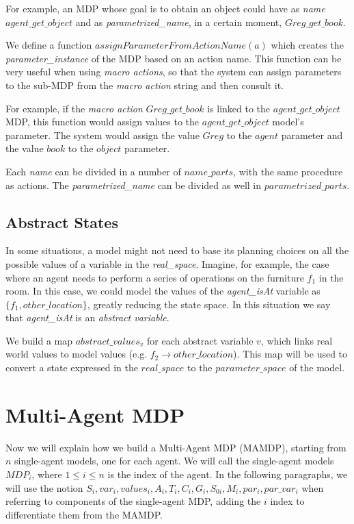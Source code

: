 For example, an MDP whose goal is to obtain an object could have as \textit{name} $agent\_get\_object$ and as \textit{parametrized\_name}, in a certain moment, $Greg\_get\_book$.

We define a function $assignParameterFromActionName(a)$ which creates the \textit{parameter\_instance} of the MDP based on an action name. This function can be very useful when using \textit{macro actions}, so that the system can assign parameters to the sub-MDP from the \textit{macro action} string and then consult it.

For example, if the \textit{macro action} $Greg\_get\_book$ is linked to the $agent\_get\_object$ MDP, this function would assign values to the  $agent\_get\_object$ model's parameter. The system would assign the value $Greg$ to the $agent$ parameter and the value $book$ to the $object$ parameter. 

Each \textit{name} can be divided in a number of $name\_parts$,  with the same procedure as actions. The \textit{parametrized\_name} can be divided as well in $parametrized\_parts$.


\subsection{Abstract States}

In some situations, a model might not need to base its planning choices on all the possible values of a variable in the \textit{real\_space}. Imagine, for example, the case where an agent needs to perform a series of operations on the furniture $f_1$ in the room. In this case, we could model the  values of the \textit{agent\_isAt} variable as $\{f_1 , other\_location\}$, greatly reducing the state space. In this situation we say that \textit{agent\_isAt} is an \textit{abstract variable}. 

We build a map $abstract\_values_v$ for each abstract variable $v$, which links real world values to model values (e.g. $f_2 \rightarrow other\_location$). This map will be used to convert a state expressed in the $real\_space$ to the $parameter\_space$ of the model. 

\section{Multi-Agent MDP}
\label{sec:mamdp-mamdp}
Now we will explain how we build a Multi-Agent MDP (MAMDP), starting from $n$ single-agent models, one for each agent. We will call the single-agent models $MDP_i$, where $1 \leq i \leq n $ is the index of the agent. In the following paragraphs, we will use the notion $S_i, var_i, values_i, A_i, T_i, C_i, G_i, S_{0i}, M_i, par_i, par\_var_i$ when referring to components of the single-agent MDP, adding the $i$ index to differentiate them from the MAMDP. 
 
